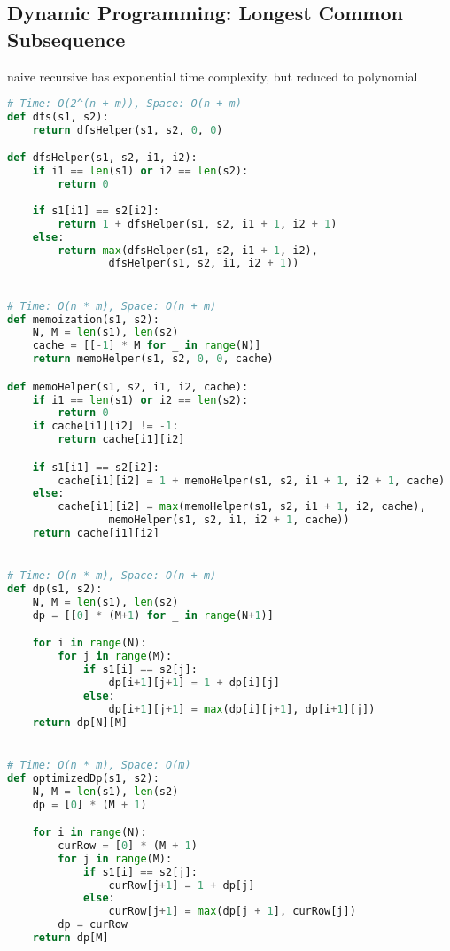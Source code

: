 \documentclass[english, threecolumn]{latex4ei/latex4ei_sheet}
\begin{document}
\begin{sectionbox}
\subsection{Dynamic Programming: Longest Common Subsequence}
naive recursive has exponential time complexity, but reduced to polynomial 
\begin{lstlisting}[language=python, gobble=0]
# Time: O(2^(n + m)), Space: O(n + m)
def dfs(s1, s2):
    return dfsHelper(s1, s2, 0, 0)

def dfsHelper(s1, s2, i1, i2):
    if i1 == len(s1) or i2 == len(s2):
        return 0
    
    if s1[i1] == s2[i2]:
        return 1 + dfsHelper(s1, s2, i1 + 1, i2 + 1)
    else:
        return max(dfsHelper(s1, s2, i1 + 1, i2),
                dfsHelper(s1, s2, i1, i2 + 1))


# Time: O(n * m), Space: O(n + m)
def memoization(s1, s2):
    N, M = len(s1), len(s2)
    cache = [[-1] * M for _ in range(N)]
    return memoHelper(s1, s2, 0, 0, cache)

def memoHelper(s1, s2, i1, i2, cache):
    if i1 == len(s1) or i2 == len(s2):
        return 0
    if cache[i1][i2] != -1:
        return cache[i1][i2]

    if s1[i1] == s2[i2]:
        cache[i1][i2] = 1 + memoHelper(s1, s2, i1 + 1, i2 + 1, cache)
    else:
        cache[i1][i2] = max(memoHelper(s1, s2, i1 + 1, i2, cache),
                memoHelper(s1, s2, i1, i2 + 1, cache))
    return cache[i1][i2]


# Time: O(n * m), Space: O(n + m)
def dp(s1, s2):
    N, M = len(s1), len(s2)
    dp = [[0] * (M+1) for _ in range(N+1)]

    for i in range(N):
        for j in range(M):
            if s1[i] == s2[j]:
                dp[i+1][j+1] = 1 + dp[i][j]
            else:
                dp[i+1][j+1] = max(dp[i][j+1], dp[i+1][j])
    return dp[N][M]


# Time: O(n * m), Space: O(m)
def optimizedDp(s1, s2):
    N, M = len(s1), len(s2)
    dp = [0] * (M + 1)

    for i in range(N):
        curRow = [0] * (M + 1)
        for j in range(M):
            if s1[i] == s2[j]:
                curRow[j+1] = 1 + dp[j]
            else:
                curRow[j+1] = max(dp[j + 1], curRow[j])
        dp = curRow
    return dp[M]
\end{lstlisting}
\end{sectionbox}
\end{document}
